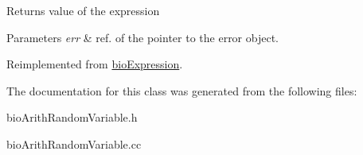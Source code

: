 \begin{DoxyReturn}{Returns}
value of the expression 
\end{DoxyReturn}

\begin{DoxyParams}{Parameters}
{\em err} & ref. of the pointer to the error object. \\
\hline
\end{DoxyParams}


Reimplemented from \hyperlink{classbio_expression_af58662a5d4d456f15bc4f2c9bd4f8a5b}{bio\+Expression}.



The documentation for this class was generated from the following files\+:\begin{DoxyCompactItemize}
\item 
bio\+Arith\+Random\+Variable.\+h\item 
bio\+Arith\+Random\+Variable.\+cc\end{DoxyCompactItemize}
